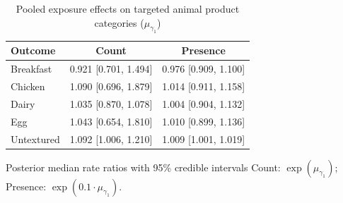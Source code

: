 \begin{table}[H]
\centering
\caption{Pooled exposure effects on targeted animal product categories ($\mu_{\gamma_1}$)}
\label{tab:a2_mu_gamma}
\begin{tabular}{lcc}
\toprule
Outcome & Count & Presence \\
\midrule
Breakfast & 0.921 [0.701, 1.494] & 0.976 [0.909, 1.100] \\
Chicken & 1.090 [0.696, 1.879] & 1.014 [0.911, 1.158] \\
Dairy & 1.035 [0.870, 1.078] & 1.004 [0.904, 1.132] \\
Egg & 1.043 [0.654, 1.810] & 1.010 [0.899, 1.136] \\
Untextured & 1.092 [1.006, 1.210] & 1.009 [1.001, 1.019] \\
\bottomrule
\end{tabular}
\par\smallskip\footnotesize Posterior median rate ratios with 95\% credible intervals Count: $\exp(\mu_{\gamma_1})$; Presence: $\exp(0.1 \cdot \mu_{\gamma_1})$.
\end{table}
